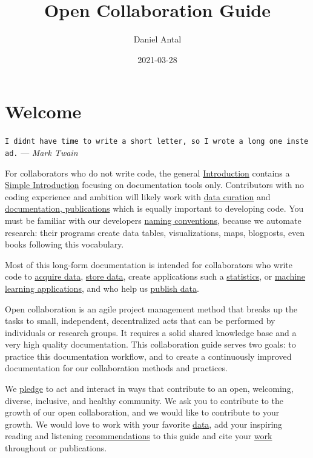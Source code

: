 \documentclass[
  fontsize=13pt,
  english,
  a4paper,
  openany, a4paper, oneside]{book}
\title{Open Collaboration Guide}
\author{Daniel Antal}
\date{2021-03-28}
\begin{document}
\maketitle

{
\hypersetup{linkcolor=}
\setcounter{tocdepth}{1}
\tableofcontents
}
\hypertarget{welcome}{%
\chapter*{Welcome}\label{welcome}}

\texttt{I\ didn\textquotesingle{}t\ have\ time\ to\ write\ a\ short\ letter,\ so\ I\ wrote\ a\ long\ one\ instead.} --- \emph{Mark Twain}

For collaborators who do not write code, the general \protect\hyperlink{intro}{Introduction} contains a \protect\hyperlink{simple-intro}{Simple Introduction} focusing on documentation tools only. Contributors with no coding experience and ambition will likely work with \protect\hyperlink{data-curation}{data curation} and \protect\hyperlink{documentation}{documentation, publications} which is equally important to developing code. You must be familiar with our developers \protect\hyperlink{naming-conventions}{naming conventions}, because we automate research: their programs create data tables, visualizations, maps, blogposts, even books following this vocabulary.

Most of this long-form documentation is intended for collaborators who write code to \protect\hyperlink{acquisition}{acquire data}, \protect\hyperlink{data-storage}{store data}, create applications such a \protect\hyperlink{statistical-software}{statistics}, or \protect\hyperlink{machine-learning}{machine learning applications}, and who help us \protect\hyperlink{data-release}{publish data}.

Open collaboration is an agile project management method that breaks up the tasks to small, independent, decentralized acts that can be performed by individuals or research groups. It requires a solid shared knowledge base and a very high quality documentation. This collaboration guide serves two goals: to practice this documentation workflow, and to create a continuously improved documentation for our collaboration methods and practices.

We \protect\hyperlink{pledge}{pledge} to act and interact in ways that contribute to an open, welcoming, diverse, inclusive, and healthy community. We ask you to contribute to the growth of our open collaboration, and we would like to contribute to your growth. We would love to work with your favorite \protect\hyperlink{data-curation}{data}, add your inspiring reading and listening \protect\hyperlink{inspiration}{recommendations} to this guide and cite your \protect\hyperlink{bibliography}{work} throughout or publications.
\end{document}
